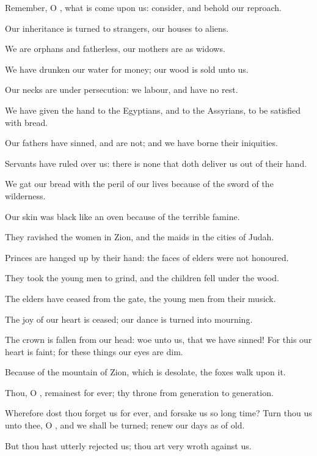 \Chapter
\Verse Remember, O \LORD, what is come upon us: consider, and behold our reproach.

\Verse Our inheritance is turned to strangers, our houses to aliens.

\Verse We are orphans and fatherless, our mothers are as widows.

\Verse We have drunken our water for money; our wood is sold unto us.

\Verse Our necks are under persecution: we labour, and have no rest.

\Verse We have given the hand to the Egyptians, and to the Assyrians, to be satisfied with bread.

\Verse Our fathers have sinned, and are not; and we have borne their iniquities.

\Verse Servants have ruled over us: there is none that doth deliver us out of their hand.

\Verse We gat our bread with the peril of our lives because of the sword of the wilderness.

\Verse Our skin was black like an oven because of the terrible famine.

\Verse They ravished the women in Zion, and the maids in the cities of Judah.

\Verse Princes are hanged up by their hand: the faces of elders were not honoured.

\Verse They took the young men to grind, and the children fell under the wood.

\Verse The elders have ceased from the gate, the young men from their musick.

\Verse The joy of our heart is ceased; our dance is turned into mourning.

\Verse The crown is fallen from our head: woe unto us, that we have sinned!  \Verse For this our heart is faint; for these things our eyes are dim.

\Verse Because of the mountain of Zion, which is desolate, the foxes walk upon it.

\Verse Thou, O \LORD, remainest for ever; thy throne from generation to generation.

\Verse Wherefore dost thou forget us for ever, and forsake us so long time?  \Verse Turn thou us unto thee, O \LORD, and we shall be turned; renew our days as of old.

\Verse But thou hast utterly rejected us; thou art very wroth against us.

